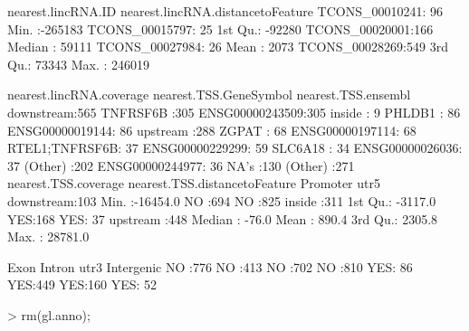 \documentclass[a4paper]{article}
\begin{document}
\begin{Schunk}
\begin{Soutput}
      nearest.lincRNA.ID nearest.lincRNA.distancetoFeature
 TCONS_00010241: 96      Min.   :-265183                  
 TCONS_00015797: 25      1st Qu.: -92280                  
 TCONS_00020001:166      Median :  59111                  
 TCONS_00027984: 26      Mean   :   2073                  
 TCONS_00028269:549      3rd Qu.:  73343                  
                         Max.   : 246019                  
                                                          
 nearest.lincRNA.coverage    nearest.TSS.GeneSymbol      nearest.TSS.ensembl
 downstream:565           TNFRSF6B      :305        ENSG00000243509:305     
 inside    :  9           PHLDB1        : 86        ENSG00000019144: 86     
 upstream  :288           ZGPAT         : 68        ENSG00000197114: 68     
                          RTEL1;TNFRSF6B: 37        ENSG00000229299: 59     
                          SLC6A18       : 34        ENSG00000026036: 37     
                          (Other)       :202        ENSG00000244977: 36     
                          NA's          :130        (Other)        :271     
 nearest.TSS.coverage nearest.TSS.distancetoFeature Promoter   utr5    
 downstream:103       Min.   :-16454.0              NO :694   NO :825  
 inside    :311       1st Qu.: -3117.0              YES:168   YES: 37  
 upstream  :448       Median :   -76.0                                 
                      Mean   :   890.4                                 
                      3rd Qu.:  2305.8                                 
                      Max.   : 28781.0                                 
                                                                       
  Exon     Intron     utr3     Intergenic
 NO :776   NO :413   NO :702   NO :810   
 YES: 86   YES:449   YES:160   YES: 52   
\end{Soutput}
\begin{Sinput}
> rm(gl.anno);
\end{Sinput}
\end{Schunk}
\end{document}
